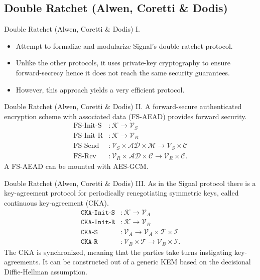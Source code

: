 \documentclass{beamer}
\renewcommand{\t}{\text}
\begin{document}
\subsection{Double Ratchet (Alwen, Coretti \& Dodis)}
\label{sec:double-ratchet-alwen}

\begin{frame}{Double Ratchet (Alwen, Coretti \& Dodis) I.}
  \begin{itemize}
  \item Attempt to formalize and modularize Signal's double ratchet protocol.
  \item Unlike the other protocols, it uses private-key cryptography to ensure
    forward-secrecy hence it does not reach the same security guarantees.
  \item However, this approach yields a very efficient protocol.
  \end{itemize}
\end{frame}

\begin{frame}{Double Ratchet (Alwen, Coretti \& Dodis) II.}
  A forward-secure authenticated encryption scheme with associated data (FS-AEAD)
  provides forward security.
  \begin{align*}
    \t{FS-Init-S} & : \mathcal{K} \rightarrow \mathcal{V}_S \\
    \t{FS-Init-R} & : \mathcal{K} \rightarrow \mathcal{V}_R \\
    \t{FS-Send} & : \mathcal{V}_S \times \mathcal{AD} \times \mathcal{M}
                                \rightarrow \mathcal{V}_S \times \mathcal{C} \\
    \t{FS-Rcv} & : \mathcal{V}_R \times \mathcal{AD} \times \mathcal{C}
                                \rightarrow \mathcal{V}_R \times \mathcal{C}.
  \end{align*}
  A FS-AEAD can be mounted with AES-GCM.
\end{frame}

\begin{frame}{Double Ratchet (Alwen, Coretti \& Dodis) III.}
  As in the Signal protocol there is a key-agreement protocol for periodically
  renegotiating symmetric keys, called continuous key-agreement (CKA).
  \begin{align*}
    \texttt{CKA-Init-S} & : \mathcal{K} \rightarrow \mathcal{V}_A \\
    \texttt{CKA-Init-R} & : \mathcal{K} \rightarrow \mathcal{V}_B \\
    \texttt{CKA-S} & : \mathcal{V}_A \rightarrow
                \mathcal{V}_A \times \mathcal{T} \times \mathcal{I} \\
    \texttt{CKA-R} & : \mathcal{V}_B \times \mathcal{T} \rightarrow
                \mathcal{V}_B \times \mathcal{I}.
  \end{align*}
  The CKA is synchronized, meaning that the parties take turns instigating
  key-agreements. It can be constructed out of a generic KEM based on
  the decisional Diffie-Hellman assumption.
\end{frame}
\end{document}
